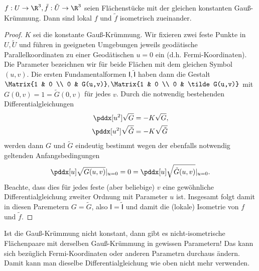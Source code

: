 \begin{st}
	$f: U \to \R^3, \tilde f: \tilde U \to \R^3$ seien Flächenstücke mit der gleichen konstanten Gauß-Krümmung.
	Dann sind lokal $f$ und $\tilde f$ isometrisch zueinander.
	\begin{proof}
		$K$ sei die konstante Gauß-Krümmung.
		Wir fixieren zwei feste Punkte in $U, \tilde U$ und führen in geeigneten Umgebungen jeweils geodätische Parallelkoordinaten zu einer Geodätischen $u = 0$ ein (d.h. Fermi-Koordinaten).
		Die Parameter bezeichnen wir für beide Flächen mit dem gleichen Symbol $(u, v)$.
		Die ersten Fundamentalformen $Ⅰ, \tilde Ⅰ$ haben dann die Gestalt $\Matrix{1 & 0 \\ 0 & G(u,v)}, \Matrix{1 & 0 \\ 0 & \tilde G(u,v)}$
		mit $G(0,v) = 1 = \tilde G(0,v)$ für jedes $v$.
		Durch die notwendig bestehenden Differentialgleichungen
		\begin{align*}
			\pddx[u^2] \sqrt G &= - K \sqrt G, \\
			\pddx[u^2] \sqrt{\tilde G} &= - K \sqrt{\tilde G}
		\end{align*}
		werden dann $G$ und $\tilde G$ eindeutig bestimmt wegen der ebenfalls notwendig geltenden Anfangsbedingungen
		\[
			\pddx[u] \sqrt{G(u,v)}|_{u=0}
			= 0 =
			\pddx[u] \sqrt{\tilde G(u,v)}|_{u=0}.
		\]
		Beachte, dass dies für jedes feste (aber beliebige) $v$ eine gewöhnliche Differentialgleichung zweiter Ordnung mit Parameter $u$ ist.
		Insgesamt folgt damit in diesen Paremetern $G = \tilde G$, also $Ⅰ = \tilde Ⅰ$ und damit die (lokale) Isometrie von $f$ und $\tilde f$.
	\end{proof}
	\begin{note}
		Ist die Gauß-Krümmung nicht konstant, dann gibt es nicht-isometrische Flächenpaare mit derselben Gauß-Krümmung in gewissen Parametern!
		Das kann sich bezüglich Fermi-Koordinaten oder anderen Parametrn durchaus ändern.
		Damit kann man dieselbe Differentialgleichung wie oben nicht mehr verwenden.
	\end{note}
\end{st}

